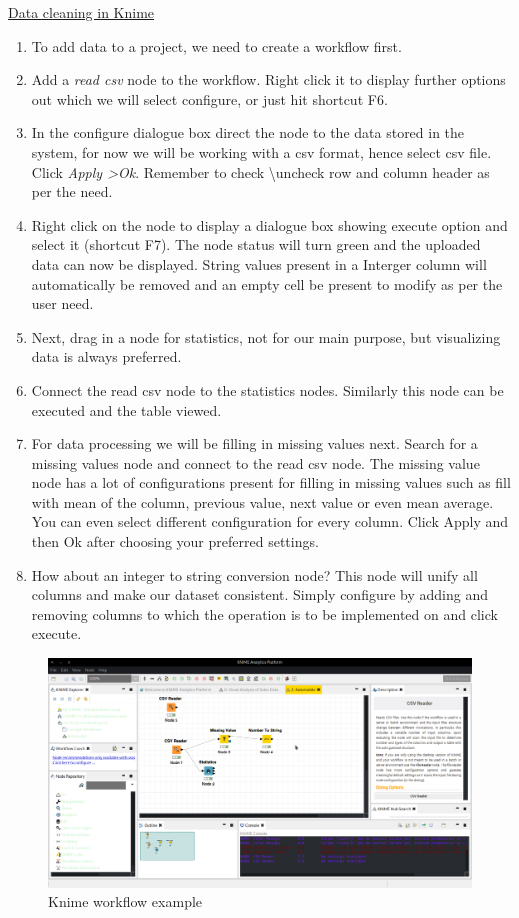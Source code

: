 \documentclass[12pt]{article}
\begin{document}
\underline{Data cleaning in Knime}
\begin{enumerate}
	\item To add data to a project, we need to create a workflow first.
	\item Add a \emph{read csv} node to the workflow. Right click it to display further options out which we will select configure, or just hit shortcut F6.
	\item In the configure dialogue box direct the node to the data stored in the system, for now we will be working with a csv format, hence select csv file. Click \emph{Apply \textgreater Ok}. Remember to check \textbackslash uncheck row and column header as per the need.
	\item Right click on the node to display a dialogue box showing execute option and select it (shortcut F7). The node status will turn green and the uploaded data can now be displayed. String values present in a Interger column will automatically be removed and an empty cell be present to modify as per the user need.
	\item Next, drag in a node for statistics, not for our main purpose, but visualizing data is always preferred. 
	\item Connect the read csv node to the statistics nodes. Similarly this node can be executed and the table viewed.
	\item For data processing we will be filling in missing values next. Search for a missing values node and connect to the read csv node. The missing value node has a lot of configurations present for filling in missing values such as fill with mean of the column, previous value, next value or even mean average. You can even select different configuration for every column. Click Apply and then Ok after choosing your preferred settings.
	\item How about an integer to string conversion node? This node will unify all columns and make our dataset consistent. Simply configure by adding and removing columns to which the operation is to be implemented on and click execute.
\end{enumerate}

\begin{figure}
  \includegraphics[width=\linewidth]{Knime.png}
  \caption{Knime workflow example}
  \label{fig:Knime Workflow}
\end{figure}
\end{document}
